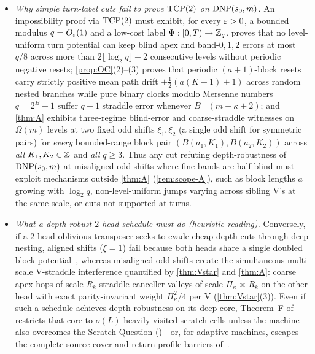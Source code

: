 \begin{itemize}[leftmargin=2em]
\item \emph{Why simple turn-label cuts fail to prove $\mathrm{TCP}(2)$ on $\mathrm{DNP}(s_0, m)$.} An impossibility proof via $\mathrm{TCP}(2)$
  must exhibit, for every $\varepsilon > 0$, a bounded modulus $q = O_\varepsilon(1)$ and a low-cost label $\Psi : [0, T) \to \mathbb{Z}_q$.
   proves that no level-uniform turn potential can keep blind apex and band-$0,1,2$ errors at most $q/8$ across
  more than $2\lfloor\log_2 q\rfloor + 2$ consecutive levels without periodic negative resets; \cref{prop:OC}(2)--(3) proves
  that periodic $(a+1)$-block resets carry strictly positive mean path drift $+\tfrac{1}{2}(a(K+1)+1)$ across random nested
  branches while pure binary clocks modulo Mersenne numbers $q = 2^B - 1$ suffer $q - 1$ straddle error whenever
  $B \mid (m - \kappa + 2)$; and \cref{thm:A} exhibits three-regime blind-error and coarse-straddle witnesses on $\Omega(m)$
  levels at two fixed odd shifts $\xi_1, \xi_2$ (a single odd shift for symmetric pairs) for \emph{every} bounded-range block
  pair $(B(a_1, K_1), B(a_2, K_2))$ across \emph{all} $K_1, K_2 \in \mathbb{Z}$ and \emph{all} $q \ge 3$. Thus any cut refuting
  depth-robustness of $\mathrm{DNP}(s_0, m)$ at misaligned odd shifts where fine bands are half-blind must exploit mechanisms
  outside \cref{thm:A} (\cref{rem:scope-A}), such as block lengths $a$ growing with $\log_2 q$, non-level-uniform jumps
  varying across sibling V's at the same scale, or cuts not supported at turns.
\item \emph{What a depth-robust $2$-head schedule must do (heuristic reading).} Conversely, if a $2$-head oblivious
  transposer seeks to evade cheap depth cuts through deep nesting, aligned shifts ($\xi = 1$) fail because both heads
  share a single doubled block potential~\cite[Proposition~5.14]{EighthPaper2026}, whereas misaligned odd shifts create the
  simultaneous multi-scale V-straddle interference quantified by \cref{thm:Vstar} and \cref{thm:A}: coarse apex hops of
  scale $R_k$ straddle canceller valleys of scale $\Pi_\kappa \asymp R_k$ on the other head with exact parity-invariant
  weight $\Pi_\kappa^2 / 4$ per V (\cref{thm:Vstar}(3)). Even if such a schedule achieves depth-robustness on its deep
  core, Theorem~F of~\cite{EighthPaper2026} restricts that core to $o(L)$ heavily visited scratch cells unless the machine
  also overcomes the Scratch Question (\cite[Section~10, Problem~10.5]{EighthPaper2026})---or, for adaptive machines,
  escapes the complete source-cover and return-profile barriers of~\cite{NinthPaper2026}.
\end{itemize}
